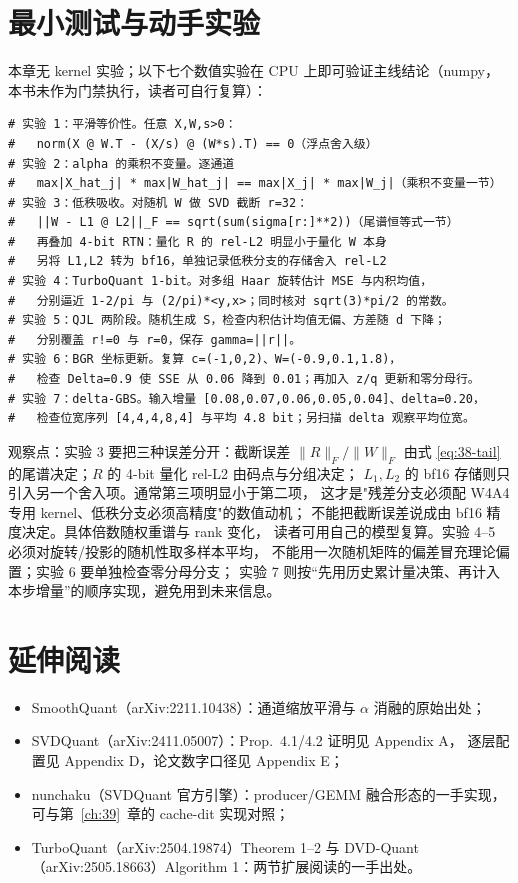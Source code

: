 \section{最小测试与动手实验}

本章无 kernel 实验；以下七个数值实验在 CPU 上即可验证主线结论（numpy，
本书未作为门禁执行，读者可自行复算）：

\begin{lstlisting}[style=console]
# 实验 1：平滑等价性。任意 X,W,s>0：
#   norm(X @ W.T - (X/s) @ (W*s).T) == 0（浮点舍入级）
# 实验 2：alpha 的乘积不变量。逐通道
#   max|X_hat_j| * max|W_hat_j| == max|X_j| * max|W_j|（乘积不变量一节）
# 实验 3：低秩吸收。对随机 W 做 SVD 截断 r=32：
#   ||W - L1 @ L2||_F == sqrt(sum(sigma[r:]**2))（尾谱恒等式一节）
#   再叠加 4-bit RTN：量化 R 的 rel-L2 明显小于量化 W 本身
#   另将 L1,L2 转为 bf16，单独记录低秩分支的存储舍入 rel-L2
# 实验 4：TurboQuant 1-bit。对多组 Haar 旋转估计 MSE 与内积均值，
#   分别逼近 1-2/pi 与 (2/pi)*<y,x>；同时核对 sqrt(3)*pi/2 的常数。
# 实验 5：QJL 两阶段。随机生成 S，检查内积估计均值无偏、方差随 d 下降；
#   分别覆盖 r!=0 与 r=0，保存 gamma=||r||。
# 实验 6：BGR 坐标更新。复算 c=(-1,0,2)、W=(-0.9,0.1,1.8)，
#   检查 Delta=0.9 使 SSE 从 0.06 降到 0.01；再加入 z/q 更新和零分母行。
# 实验 7：delta-GBS。输入增量 [0.08,0.07,0.06,0.05,0.04]、delta=0.20，
#   检查位宽序列 [4,4,4,8,4] 与平均 4.8 bit；另扫描 delta 观察平均位宽。
\end{lstlisting}

观察点：实验 3 要把三种误差分开：截断误差 $\|R\|_F/\|W\|_F$ 由式
\ref{eq:38-tail} 的尾谱决定；$R$ 的 4-bit 量化 rel-L2 由码点与分组决定；
$L_1,L_2$ 的 bf16 存储则只引入另一个舍入项。通常第三项明显小于第二项，
这才是"残差分支必须配 W4A4 专用 kernel、低秩分支必须高精度"的数值动机；
不能把截断误差说成由 bf16 精度决定。具体倍数随权重谱与 rank 变化，
读者可用自己的模型复算。实验 4--5 必须对旋转/投影的随机性取多样本平均，
不能用一次随机矩阵的偏差冒充理论偏置；实验 6 要单独检查零分母分支；
实验 7 则按“先用历史累计量决策、再计入本步增量”的顺序实现，避免用到未来信息。

\section*{延伸阅读}

\begin{itemize}[itemsep=1pt,topsep=2pt]
  \item SmoothQuant（arXiv:2211.10438）：通道缩放平滑与 $\alpha$ 消融的原始出处；
  \item SVDQuant（arXiv:2411.05007）：Prop.~4.1/4.2 证明见 Appendix A，
        逐层配置见 Appendix D，论文数字口径见 Appendix E；
  \item nunchaku（SVDQuant 官方引擎）：producer/GEMM 融合形态的一手实现，
        可与第~\ref{ch:39}~章的 cache-dit 实现对照；
  \item TurboQuant（arXiv:2504.19874）Theorem 1--2 与 DVD-Quant
        （arXiv:2505.18663）Algorithm 1：两节扩展阅读的一手出处。
\end{itemize}

